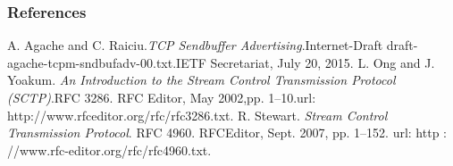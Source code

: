 \documentclass{beamer}
\begin{document}
\begin{frame}[allowframebreaks]
  \frametitle<presentation>{References}   

\begin{thebibliography}{100}
A. Agache and C. Raiciu.\textit{TCP Sendbuffer Advertising}.Internet-Draft draft-agache-tcpm-sndbufadv-00.txt.IETF Secretariat, July 20, 2015.
L. Ong and J. Yoakum. \textit{An Introduction to the Stream Control Transmission Protocol (SCTP)}.RFC 3286. RFC Editor, May 2002,pp. 1–10.\newline url: http://www.rfceditor.org/rfc/rfc3286.txt.
R. Stewart. \textit{Stream Control Transmission Protocol}. RFC 4960. RFCEditor, Sept. 2007, pp. 1–152. \newline url: http : //www.rfc-editor.org/rfc/rfc4960.txt.
\end{thebibliography}{}
\end{frame}
\end{document}
